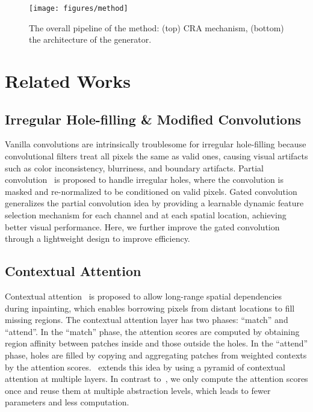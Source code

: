 \documentclass[oribibl]{llncs}  \usepackage[width=122mm,left=12mm,paperwidth=146mm,height=193mm,top=12mm,paperheight=217mm]{geometry}
\begin{document}
\begin{figure*}[t]
\begin{center}
  \texttt{[image: figures/method]}
\end{center}
   \caption{The overall pipeline of the method: (top) CRA mechanism, (bottom) the architecture of the generator.}
\label{fig:method}
\end{figure*}

\section{Related Works}
\subsection{Irregular Hole-filling \& Modified Convolutions}
Vanilla convolutions are intrinsically troublesome for irregular hole-filling because convolutional filters treat all pixels the same as valid ones, causing visual artifacts such as color inconsistency, blurriness, and boundary artifacts. Partial convolution~\cite{liu2018image} is proposed to handle irregular holes, where the convolution is masked and re-normalized to be conditioned on valid pixels. Gated convolution~\cite{yu2018free} generalizes the partial convolution idea by providing a learnable dynamic feature selection mechanism for each channel and at each spatial location, achieving better visual performance. Here, we further improve the gated convolution through a lightweight design to improve efficiency.

\subsection{Contextual Attention}
Contextual attention~\cite{yu2018generative} is proposed to allow long-range spatial dependencies during inpainting, which enables borrowing pixels from distant locations to fill missing regions. The contextual attention layer has two phases: ``match'' and ``attend''. In the ``match'' phase, the attention scores are computed by obtaining region affinity between patches inside and those outside the holes. In the ``attend'' phase, holes are filled by copying and aggregating patches from weighted contexts by the attention scores.~\cite{zeng2019learning} extends this idea by using a pyramid of contextual attention at multiple layers. In contrast to~\cite{zeng2019learning}, we only compute the attention scores once and reuse them at multiple abstraction levels, which leads to fewer parameters and less computation. 
\end{document}
